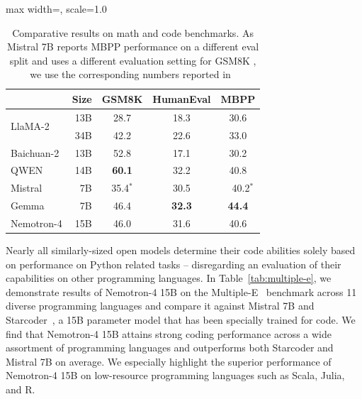 \documentclass[11pt]{article}
\newcommand{\ours}{Nemotron-4}
\begin{document}
\begin{table}[H]
\centering
\begin{adjustbox}{max width=\textwidth, scale=1.0}
\begin{tabular}{lrccc}
\toprule
& Size & GSM8K & HumanEval & MBPP \\
\midrule
  \multirow{2}{*}{LlaMA-2} & 13B & 28.7 & 18.3 &30.6 \\ 
 & 34B & 42.2 & 22.6 & 33.0 \\
 \midrule
 \multirow{1}{*}{Baichuan-2}  & 13B & 52.8 & 17.1  & 30.2 \\ 
 \midrule
 \multirow{1}{*}{QWEN}  & 14B & \textbf{60.1} & 32.2 & 40.8 \\
 \midrule
\multirow{1}{*}{Mistral}  & 7B & 35.4$^{*}$  &  30.5 &  \ \ 40.2$^{*}$   \\
\midrule
\multirow{1}{*}{Gemma}  & 7B & 46.4 &  \textbf{32.3} & \textbf{44.4} \\
\midrule
\multirow{1}{*}{\ours{}}  & 15B & 46.0 &   31.6 & 40.6  \\
\bottomrule
\end{tabular}
\end{adjustbox}
\caption{\label{tab:code_external} Comparative results on math and code benchmarks. As Mistral 7B reports MBPP performance on a different eval split and uses a different evaluation setting for GSM8K , we use the corresponding numbers reported in~\citep{gemma24}}
\end{table}

Nearly all similarly-sized open models determine their code abilities solely based on performance on Python related tasks -- disregarding an evaluation of their capabilities on other programming languages. In Table~\ref{tab:multiple-e}, we demonstrate results of \ours{} 15B on the Multiple-E~\citep{cassano2023multipl} benchmark across 11 diverse programming languages and compare it against Mistral 7B and Starcoder~\citep{li2023starcoder}, a 15B parameter model that has been specially trained for code. We find that \ours{} 15B attains strong coding performance across a wide assortment of programming languages and outperforms both Starcoder and Mistral 7B on average. We especially highlight the superior performance of \ours{} 15B on low-resource programming languages such as Scala, Julia, and R. 
\end{document}
